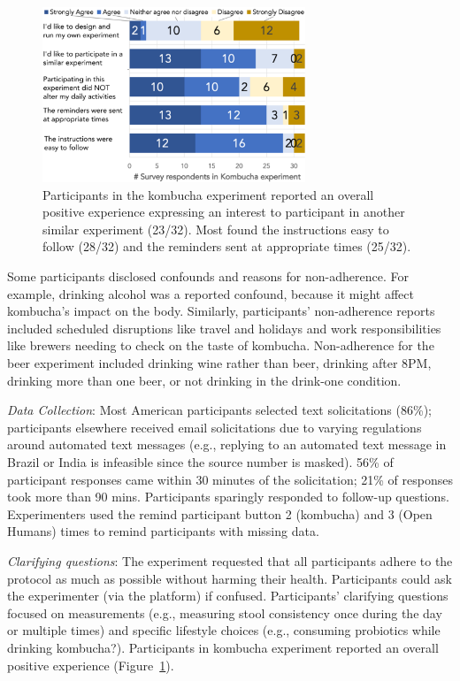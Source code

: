 \begin{figure}[h]
\centering
  \includegraphics[width=0.7\textwidth]{figures/galileo/galileo-study3-2}
  \caption[Participants in the kombucha experiment reported an overall positive experience]
{Participants in the kombucha experiment reported an overall positive experience expressing an interest to participant in another similar experiment (23/32). Most found the instructions easy to follow (28/32) and the reminders sent at appropriate times (25/32). }
  \label{fig:galileo-result3-2}
\end{figure}

Some participants disclosed confounds and reasons for non-adherence. For example, drinking alcohol was a reported confound, because it might affect kombucha's impact on the body. Similarly, participants' non-adherence reports included scheduled disruptions like travel and holidays and work responsibilities like brewers needing to check on the taste of kombucha. Non-adherence for the beer experiment included drinking wine rather than beer, drinking after 8PM, drinking more than one beer, or not drinking in the drink-one condition.

\textit{Data Collection}: Most American participants selected text solicitations (86\%); participants elsewhere received email solicitations due to varying regulations around automated text messages (e.g., replying to an automated text message in Brazil or India is infeasible since the source number is masked). 56\% of participant responses came within 30 minutes of the solicitation; 21\% of responses took more than 90 mins. Participants sparingly responded to follow-up questions. Experimenters used the remind participant button 2 (kombucha) and 3 (Open Humans) times to remind participants with missing data.

\textit{Clarifying questions}: The experiment requested that all participants adhere to the protocol as much as possible without harming their health. Participants could ask the experimenter (via the platform) if confused. Participants' clarifying questions focused on measurements (e.g., measuring stool consistency once during the day or multiple times) and specific lifestyle choices (e.g., consuming probiotics while drinking kombucha?). Participants in kombucha experiment reported an overall positive experience (Figure~\ref{fig:galileo-result3-2}).

